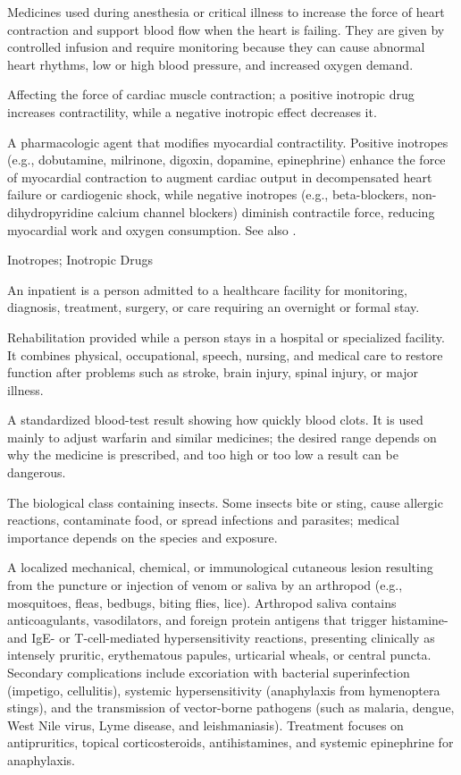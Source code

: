  Medicines used during anesthesia or critical illness to increase the force of heart contraction and support blood flow when the heart is failing. They are given by controlled infusion and require monitoring because they can cause abnormal heart rhythms, low or high blood pressure, and increased oxygen demand.

 Affecting the force of cardiac muscle contraction; a positive inotropic drug increases contractility, while a negative inotropic effect decreases it.

 A pharmacologic agent that modifies myocardial contractility. Positive inotropes (e.g., dobutamine, milrinone, digoxin, dopamine, epinephrine) enhance the force of myocardial contraction to augment cardiac output in decompensated heart failure or cardiogenic shock, while negative inotropes (e.g., beta-blockers, non-dihydropyridine calcium channel blockers) diminish contractile force, reducing myocardial work and oxygen consumption. See also .

\synonyms
Inotropes; Inotropic Drugs

 An inpatient is a person admitted to a healthcare facility for monitoring, diagnosis, treatment, surgery, or care requiring an overnight or formal stay.

 Rehabilitation provided while a person stays in a hospital or specialized facility. It combines physical, occupational, speech, nursing, and medical care to restore function after problems such as stroke, brain injury, spinal injury, or major illness.

 A standardized blood-test result showing how quickly blood clots. It is used mainly to adjust warfarin and similar medicines; the desired range depends on why the medicine is prescribed, and too high or too low a result can be dangerous.

 The biological class containing insects. Some insects bite or sting, cause allergic reactions, contaminate food, or spread infections and parasites; medical importance depends on the species and exposure.

 A localized mechanical, chemical, or immunological cutaneous lesion resulting from the puncture or injection of venom or saliva by an arthropod (e.g., mosquitoes, fleas, bedbugs, biting flies, lice). Arthropod saliva contains anticoagulants, vasodilators, and foreign protein antigens that trigger histamine- and IgE- or T-cell-mediated hypersensitivity reactions, presenting clinically as intensely pruritic, erythematous papules, urticarial wheals, or central puncta. Secondary complications include excoriation with bacterial superinfection (impetigo, cellulitis), systemic hypersensitivity (anaphylaxis from hymenoptera stings), and the transmission of vector-borne pathogens (such as malaria, dengue, West Nile virus, Lyme disease, and leishmaniasis). Treatment focuses on antipruritics, topical corticosteroids, antihistamines, and systemic epinephrine for anaphylaxis.

